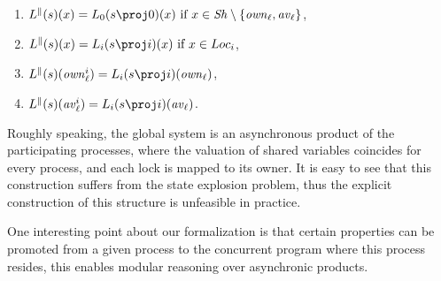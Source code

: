 \begin{definition}
\begin{enumerate}
	\item $L^\parallel(s)(x)  =  L_0(s \proj 0)(x) \mbox{ if } x \in \mathit{Sh} \setminus \{\mathit{own}_\ell, \mathit{av}_\ell\}$,
	\item $L^\parallel(s)(x) =  L_i(s \proj i)(x) \mbox{ if } x \in Loc_i$,
	\item $L^\parallel(s)(\mathit{own}^i_\ell)  =  L_i(s \proj i)(\mathit{own}_\ell)$,
	\item $L^\parallel(s)(\mathit{av}^i_\ell)  =  L_i(s \proj i)(\mathit{av}_\ell)$.
\end{enumerate}
\end{definition}
Roughly speaking, the global system is an asynchronous product of the participating processes, where  the valuation of shared variables coincides for every process, and each lock is mapped to its owner. It is easy to see that this construction suffers from the state explosion problem, thus the explicit construction of this structure is unfeasible in practice.

One interesting point about our formalization  is that certain properties can be promoted from a given process to the concurrent program where this process resides, this enables modular reasoning over asynchronic products.
		
